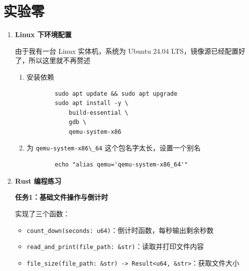 \documentclass{SYSUReport}
\date{\today}
\begin{document}
\cover
{}
\thispagestyle{empty} %
\clearpage

\clearpage

\setcounter{page}{1}


\section{实验零}
\begin{enumerate}[label={\chinese*、},labelsep=0pt]
    
    \item \textbf{Linux 下环境配置}
    
由于我有一台 Linux 实体机，系统为 Ubuntu 24.04 LTS，镜像源已经配置好了，所以这里就不再赘述

    \begin{enumerate}[label = \arabic*、]
        \item 安装依赖
        
        \begin{verbatim}
        sudo apt update && sudo apt upgrade
        sudo apt install -y \
            build-essential \
            gdb \
            qemu-system-x86
        \end{verbatim}

        \item 为 \verb|qemu-system-x86\_64| 这个包名字太长，设置一个别名
        
        \begin{verbatim}
        echo "alias qemu='qemu-system-x86_64'"    
        \end{verbatim}


    \end{enumerate}
    
    \item \textbf{Rust 编程练习}
    
    \textbf{任务1：基础文件操作与倒计时}
    
    实现了三个函数：
    \begin{itemize}
        \item \texttt{count\_down(seconds: u64)}：倒计时函数，每秒输出剩余秒数
        \item \texttt{read\_and\_print(file\_path: \&str)}：读取并打印文件内容
        \item \texttt{file\_size(file\_path: \&str) -> Result<u64, \&str>}：获取文件大小
    \end{itemize}
    

\end{enumerate}
\end{document}

